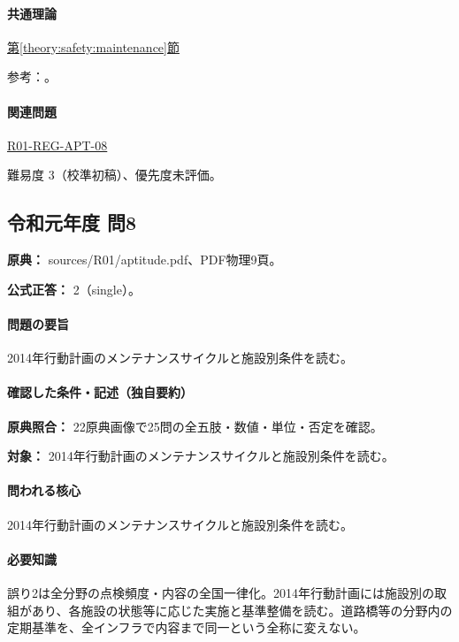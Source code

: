 \paragraph{共通理論} \hyperref[theory:safety:maintenance]{第\ref*{theory:safety:maintenance}節}

\par 参考：\cite{eng52_infra2014,eng52_adopt}。

\paragraph{関連問題} \hyperref[q:r01-reg-apt-08]{R01-REG-APT-08}

\par 難易度 3（校準初稿）、優先度未評価。

\subsection{令和元年度 問8}
\label{q:r01-reg-apt-08}

\noindent\textbf{原典：} sources/R01/aptitude.pdf、PDF物理9頁。

\textbf{公式正答：} 2（single）。

\paragraph{問題の要旨} 2014年行動計画のメンテナンスサイクルと施設別条件を読む。

\paragraph{確認した条件・記述（独自要約）}\mbox{}\par

\noindent\textbf{原典照合：} 22原典画像で25問の全五肢・数値・単位・否定を確認。\par

\noindent\textbf{対象：} 2014年行動計画のメンテナンスサイクルと施設別条件を読む。\par

\paragraph{問われる核心} 2014年行動計画のメンテナンスサイクルと施設別条件を読む。

\paragraph{必要知識} 誤り2は全分野の点検頻度・内容の全国一律化。2014年行動計画には施設別の取組があり、各施設の状態等に応じた実施と基準整備を読む。道路橋等の分野内の定期基準を、全インフラで内容まで同一という全称に変えない。

